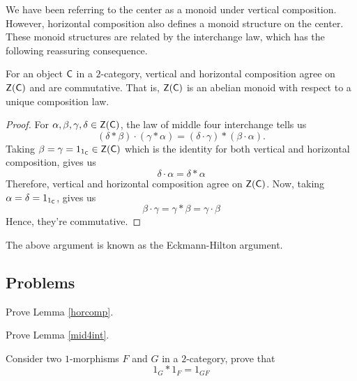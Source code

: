 We have been referring to the center as a monoid under vertical composition. However, horizontal composition also defines a monoid structure on the center. These monoid structures are related by the interchange law, which has the following reassuring consequence.
\begin{proposition}
For an object $\mathsf{C}$ in a $2$-category, vertical and horizontal composition agree on $\mathsf{Z}(\mathsf{C})$ and are commutative. That is, $\mathsf{Z}(\mathsf{C})$ is an abelian monoid with respect to a unique composition law.
\end{proposition}
\begin{proof}
For $\alpha,\beta,\gamma,\delta \in \mathsf{Z}(\mathsf{C})$, the law of middle four interchange tells us
\[(\delta * \beta)\cdot (\gamma * \alpha) = (\delta\cdot\gamma)*(\beta\cdot\alpha).\]
Taking $\beta = \gamma = 1_{1_{\mathsf{C}}} \in \mathsf{Z}(\mathsf{C})$ which is the identity for both vertical and horizontal composition, gives us
\[\delta \cdot \alpha = \delta * \alpha\]
Therefore, vertical and horizontal composition agree on $\mathsf{Z}(\mathsf{C})$. Now, taking $\alpha = \delta = 1_{1_{\mathsf{C}}}$, gives us
\[\beta\cdot\gamma = \gamma * \beta = \gamma\cdot\beta\]
Hence, they're commutative.
\end{proof}
The above argument is known as the Eckmann-Hilton argument.

\vspace*{0.2in}

\subsection{Problems}\vspace{0.1in}

\begin{problem}\label{prob A.1}
Prove Lemma \ref{horcomp}.
\end{problem}

\vspace*{0.1in}

\begin{problem}\label{prob A.2}
Prove Lemma \ref{mid4int}.
\end{problem}

\vspace*{0.1in}

\begin{problem}\label{prob A.3}
Consider two $1$-morphisms $F$ and $G$ in a $2$-category, prove that
\[1_G * 1_F = 1_{GF}\]
\end{problem}

